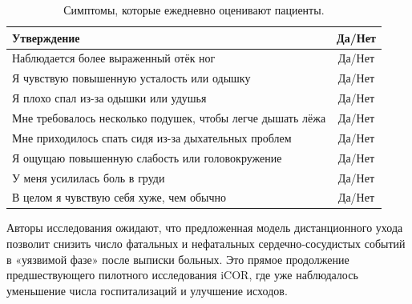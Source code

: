 \begin{table}[h!tbp]
    \caption{Симптомы, которые ежедневно оценивают пациенты.}
    \label{tab:timesandtenses}
    \begin{center}
        \begin{tabular}{|p{10cm}|c|}
            \hline
            \textbf{Утверждение} & \textbf{Да/Нет} \\
            \hline
            Наблюдается более выраженный отёк ног & Да/Нет \\
            \hline
            Я чувствую повышенную усталость или одышку & Да/Нет \\
            \hline
            Я плохо спал из-за одышки или удушья & Да/Нет \\
            \hline
            Мне требовалось несколько подушек, чтобы легче дышать лёжа & Да/Нет \\
            \hline
            Мне приходилось спать сидя из-за дыхательных проблем & Да/Нет \\
            \hline
            Я ощущаю повышенную слабость или головокружение & Да/Нет \\
            \hline
            У меня усилилась боль в груди & Да/Нет \\
            \hline
            В целом я чувствую себя хуже, чем обычно & Да/Нет \\
            \hline
        \end{tabular}
    \end{center}
\end{table}

Авторы исследования ожидают, что предложенная модель дистанционного ухода позволит снизить число фатальных и нефатальных сердечно‑сосудистых событий в «уязвимой фазе» после выписки больных.
Это прямое продолжение предшествующего пилотного исследования iCOR, где уже наблюдалось уменьшение числа госпитализаций и улучшение исходов.